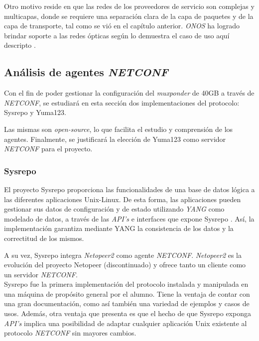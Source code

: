 Otro motivo reside en que las redes de los proveedores de servicio son complejas y multicapas, donde se requiere una separación clara de la capa de paquetes y de la capa de transporte, tal como se vió en el capítulo anterior. \textit{ONOS} ha logrado brindar soporte a las redes ópticas según lo demuestra el caso de uso aquí descripto \parencite{onffwhite}.

\subsection{Análisis de agentes \textit{NETCONF}}

Con el fin de poder gestionar la configuración del \textit{muxponder} de 40GB a través de \textit{NETCONF}, se estudiará en esta sección dos implementaciones del protocolo: Sysrepo y Yuma123. 

Las mismas son \textit{open-source}, lo que facilita el estudio y comprensión de los agentes. Finalmente, se justificará la elección de Yuma123 como servidor \textit{NETCONF} para el proyecto.

\subsubsection{Sysrepo}
El proyecto Sysrepo proporciona las funcionalidades de una base de datos lógica a las diferentes aplicaciones Unix-Linux. De esta forma, las aplicaciones pueden gestionar sus datos de configuración y de estado utilizando \textit{YANG} como modelado de datos, a través de las \textit{API’s} e interfaces que expone Sysrepo \parencite{sysrepogit}. Así, la implementación garantiza mediante YANG la consistencia de los datos y la correctitud de los mismos. 

A su vez, Sysrepo integra \textit{Netopeer2} \parencite{netopeergit} como agente \textit{NETCONF}. \textit{Netopeer2} es la evolución del proyecto Netopeer \parencite{netopeergit1} (discontinuado) y ofrece tanto un cliente como un servidor \textit{NETCONF}.
\\

Sysrepo fue la primera implementación del protocolo instalada y manipulada en una máquina de propósito general por el alumno. Tiene la ventaja de contar con una gran documentación, como así también una variedad de ejemplos y casos de usos. Además, otra ventaja que presenta es que el hecho de que Sysrepo exponga \textit{API’s} implica una posibilidad de adaptar cualquier aplicación Unix existente al protocolo \textit{NETCONF} sin mayores cambios.  

